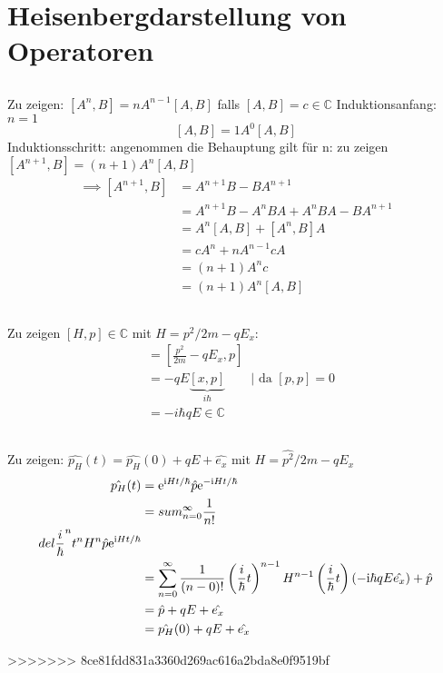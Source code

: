 \section{Heisenbergdarstellung von Operatoren}
\subsection{}
Zu zeigen:
$[A^n,B] = nA^{n-1}[A,B]$ falls $[A,B] = c \in \mathbb C$
Induktionsanfang: $n=1$
\[
    [A,B] = 1A^0[A,B]
\]
Induktionsschritt: angenommen die Behauptung gilt für n: zu zeigen $[A^{n+1},B] = (n+1)A^n[A,B]$
\begin{align*}
    \implies [A^{n+1},B] &= A^{n+1}B-BA^{n+1} \\
                         &= A^{n+1}B-A^nBA+A^nBA-BA^{n+1} \\
                         &= A^n[A,B]+[A^n,B]A \\
                         &= cA^n+nA^{n-1}cA \\
                         &= (n+1)A^nc \\
                         &= (n+1)A^n[A,B]
\end{align*}

\subsection{}
Zu zeigen $[H,p] \in\mathbb C$ mit $H = p^2/2m-qE_x$:
\begin{align*}
    [H,p] &= [\frac{p^2}{2m}-qE_x,p] \\
          &= -qE\underbrace{[x,p]}_{i\hbar} \qquad|\text{ da }[p,p]=0 \\
          &= -i\hbar qE \in\mathbb C
\end{align*}

\subsection{}
Zu zeigen: $\hat{p_H}(t) = \hat{p_H}(0)+qE+\hat{e_x}$ mit $H=\hat{p^2}/2m-qE_x$
\begin{align*}
    \hat{p_H}(t) &= \ee^{\ii Ht/\hbar}\hat{p}\ee^{-\ii Ht/\hbar} \\
                 &= sum^\infty_{n=0}\frac 1{n!}\\del{\frac i\hbar}^nt^nH^n\hat p\ee^{\ii Ht/\hbar} \\
                 &= \sum^\infty_{n=0} \frac 1{(n-0)!}\del{\frac i\hbar t}^{n-1}H^{n-1}\del{\frac i\hbar t}(-\ii\hbar qE\hat{e_x})+\hat p \\
                 &= \hat p + qE+\hat{e_x} \\
                 &=\hat{p_H}(0)+qE+\hat{e_x}
\end{align*}


    



>>>>>>> 8ce81fdd831a3360d269ac616a2bda8e0f9519bf

